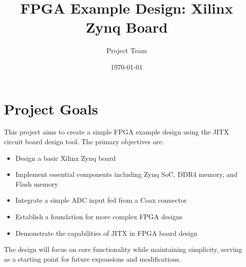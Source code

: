 \documentclass{article}
\title{FPGA Example Design: Xilinx Zynq Board}
\author{Project Team}
\date{\today}
\begin{document}
\maketitle

\section{Project Goals}

This project aims to create a simple FPGA example design using the JITX circuit board design tool. The primary objectives are:

\begin{itemize}
    \item Design a basic Xilinx Zynq board
    \item Implement essential components including Zynq SoC, DDR4 memory, and Flash memory
    \item Integrate a simple ADC input fed from a Coax connector
    \item Establish a foundation for more complex FPGA designs
    \item Demonstrate the capabilities of JITX in FPGA board design
\end{itemize}

The design will focus on core functionality while maintaining simplicity, serving as a starting point for future expansions and modifications.
\end{document}
